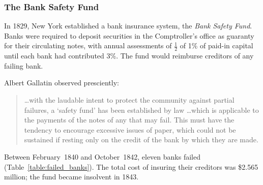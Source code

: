 \documentclass[11pt]{article}
\begin{document}
\subsubsection{The Bank Safety Fund}

In 1829, New York established a bank insurance system, the \emph{Bank Safety
Fund}.  Banks were required to deposit securities in the Comptroller's office
as guaranty for their circulating notes, with annual assessments of
$\frac{1}{2}$ of 1\% of paid-in capital until each bank had contributed 3\%.
The fund would reimburse creditors of any failing bank.

Albert Gallatin observed presciently:
\begin{quote}
\ldots with the laudable intent to protect the community against partial
failures, a `safety fund' has been established by law \ldots which is
applicable to the payments of the notes of any that may fail.  This must have
the tendency to encourage excessive issues of paper, which could not be
sustained if resting only on the credit of the bank by which they are made.
\citep{Bodenhorn_1996}
\end{quote}

Between February~1840 and October~1842, eleven banks failed (Table~\ref{table:failed_banks}).
The total cost of insuring their creditors was \$2.565 million; the fund became
insolvent in 1843.
\end{document}
